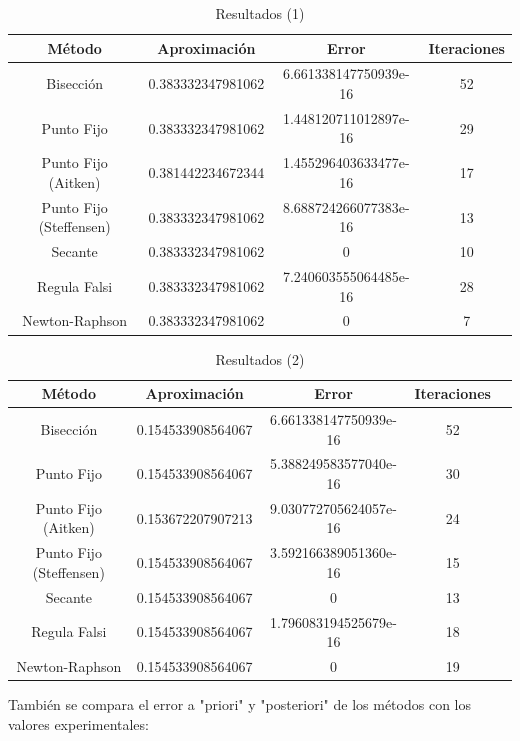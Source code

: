 \documentclass{memoria}
\begin{document}
\begin{table}[H]
\begin{tabular}{|c|c|c|c|}
\hline
\textbf{Método} & \textbf{Aproximación} & \textbf{Error} & \textbf{Iteraciones}\\ \hline
Bisección       & 0.383332347981062     & 6.661338147750939e-16  & 52\\ \hline
Punto Fijo        & 0.383332347981062     & 1.448120711012897e-16  & 29\\ \hline
Punto Fijo (Aitken) & 0.381442234672344 & 1.455296403633477e-16 & 17\\ \hline
Punto Fijo (Steffensen) & 0.383332347981062 & 8.688724266077383e-16 & 13\\ \hline
Secante         & 0.383332347981062     & 0  & 10\\ \hline
Regula Falsi    & 0.383332347981062     & 7.240603555064485e-16 & 28\\ \hline
Newton-Raphson    & 0.383332347981062     & 0 & 7\\ \hline
\end{tabular}
\caption{Resultados (1)}
\label{tab:my_label}
\end{table}

\begin{table}[H]
\centering
\begin{tabular}{|c|c|c|c|c|}
\hline
\textbf{Método} & \textbf{Aproximación} & \textbf{Error} & \textbf{Iteraciones}\\ \hline
Bisección       & 0.154533908564067     & 6.661338147750939e-16 & 52\\ \hline
Punto Fijo        & 0.154533908564067     & 5.388249583577040e-16 & 30\\ \hline
Punto Fijo (Aitken) & 0.153672207907213 & 9.030772705624057e-16 & 24\\ \hline
Punto Fijo (Steffensen) & 0.154533908564067 & 3.592166389051360e-16 & 15\\ \hline
Secante         & 0.154533908564067     & 0 & 13\\ \hline
Regula Falsi    & 0.154533908564067     & 1.796083194525679e-16 & 18\\ \hline
Newton-Raphson    & 0.154533908564067     & 0 & 19\\ \hline
\end{tabular}
\caption{Resultados (2)}
    \label{tab:my_label}
\end{table}

También se compara el error a "priori" y "posteriori" de los métodos con los valores experimentales:
\end{document}
